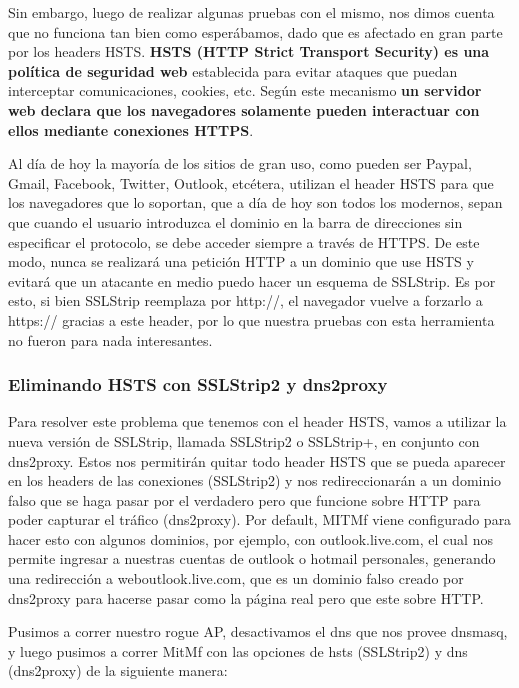 Sin embargo, luego de realizar algunas pruebas con el mismo, nos dimos cuenta que no funciona tan bien como esperábamos, dado que es afectado 
en gran parte por los headers HSTS. \textbf{HSTS (HTTP Strict Transport Security) es una política de seguridad web} establecida para evitar ataques 
que puedan interceptar comunicaciones, cookies, etc. Según este mecanismo \textbf{un servidor web declara que los navegadores solamente pueden 
interactuar con ellos mediante conexiones HTTPS}. 

Al día de hoy la mayoría de los sitios de gran uso, como pueden ser Paypal, Gmail, Facebook, Twitter, Outlook, etcétera, utilizan el header 
HSTS para que los navegadores que lo soportan, que a día de hoy son todos los modernos, sepan que cuando el usuario introduzca el dominio en la barra de 
direcciones sin especificar el protocolo, se debe acceder siempre a través de HTTPS. De este modo, nunca se realizará una petición HTTP a un 
dominio que use HSTS y evitará que un atacante en medio puedo hacer un esquema de SSLStrip. Es por esto, si bien SSLStrip reemplaza por 
http://, el navegador vuelve a forzarlo a https:// gracias a este header, por lo que nuestra pruebas con esta herramienta no fueron para 
nada interesantes.

\subsubsection{Eliminando HSTS con SSLStrip2 y dns2proxy}

Para resolver este problema que tenemos con el header HSTS, vamos a utilizar la nueva versión de SSLStrip, llamada SSLStrip2 o SSLStrip+, en conjunto
con dns2proxy. Estos nos permitirán quitar todo header HSTS que se pueda aparecer en los headers de las conexiones (SSLStrip2) y nos 
redireccionarán a un dominio falso que se haga pasar por el verdadero pero que funcione sobre HTTP para poder capturar el tráfico (dns2proxy). 
Por default, MITMf viene configurado para hacer esto con algunos dominios, por ejemplo, con outlook.live.com, el cual nos permite ingresar a nuestras 
cuentas de outlook o hotmail personales, generando una redirección a weboutlook.live.com, que es un dominio falso creado por dns2proxy para hacerse pasar
como la página real pero que este sobre HTTP. 

Pusimos a correr nuestro rogue AP, desactivamos el dns que nos provee dnsmasq, y luego pusimos a correr MitMf con las opciones de hsts 
(SSLStrip2) y dns (dns2proxy) de la siguiente manera:

